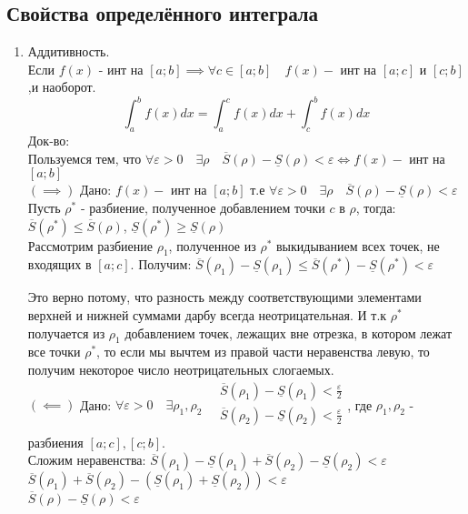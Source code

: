 \documentclass[11pt]{article}
\begin{document}
        \subsection{Свойства определённого интеграла}
        \begin{enumerate}
            \item Аддитивность.\\
            Если $f(x)$ - инт на $[a; b] \implies \forall c \in [a; b] \quad f(x) - $ инт на $[a; c]$ и $[c; b]$,\quad и наоборот.
            \[\int_{a}^{b}f(x)dx = \int_{a}^{c}f(x)dx + \int_{c}^{b}f(x)dx\]
            Док-во:\\
            Пользуемся тем, что\quad
            $\forall \varepsilon > 0 \quad \exists \rho \quad \overline{S}(\rho) - \underline{S}(\rho) < \varepsilon \iff f(x) -$ инт на $[a; b]$\\

            $(\implies)$
            Дано: $f(x) -$ инт на $[a; b]$ \quad т.е \quad
            $\forall \varepsilon > 0 \quad \exists \rho \quad \overline{S}(\rho) - \underline{S}(\rho) < \varepsilon$\\
            Пусть $\rho^*$ - разбиение, полученное добавлением точки $c$ в $\rho$, тогда:\\
            $\overline{S}(\rho^*) \leq \overline{S}(\rho)$, \quad $\underline{S}(\rho^*) \geq \underline{S}(\rho)$\\
            Рассмотрим разбиение $\rho_1$, полученное из $\rho^*$ выкидыванием всех точек, не входящих в $[a; c]$.
            Получим: $\overline{S}(\rho_1) - \underline{S}(\rho_1) \leq \overline{S}(\rho^*) - \underline{S}(\rho^*) < \varepsilon$
            
            Это верно потому, что разность между соответствующими элементами верхней и нижней суммами дарбу всегда неотрицательная.
            И т.к $\rho^*$ получается из $\rho_1$ добавлением точек, лежащих вне отрезка, в котором лежат все точки $\rho^*$, 
            то если мы вычтем из правой части неравенства левую, то получим некоторое число неотрицательных слогаемых.\\
            $(\impliedby)$ Дано: $\forall \varepsilon > 0 \quad \exists \rho_1, \rho_2 \quad \begin{array}{l}
                \overline{S}(\rho_1) - \underline{S}(\rho_1) < \frac{\varepsilon}{2} \\
                \overline{S}(\rho_2) - \underline{S}(\rho_2) < \frac{\varepsilon}{2} \\
            \end{array}$,
            где $\rho_1, \rho_ 2$ - разбиения $[a; c], [c; b]$.\\
            Сложим неравенства: $\overline{S}(\rho_1) - \underline{S}(\rho_1) + \overline{S}(\rho_2) - \underline{S}(\rho_2) < \varepsilon$\\
            $\overline{S}(\rho_1) + \overline{S}(\rho_2) - (\underline{S}(\rho_1) + \underline{S}(\rho_2)) < \varepsilon$\\
            $\overline{S}(\rho) - \underline{S}(\rho) < \varepsilon$\\
            

\end{enumerate}
\end{document}
